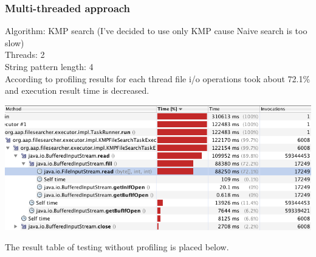 \documentclass[a4paper,12pt,final]{article}
\begin{document}
\subsubsection*{Multi-threaded approach}
Algorithm: KMP search (I've decided to use only KMP cause Naive search is too slow)\\
Threads: 2\\
String pattern length: 4\\

According to profiling results for each thread file i/o operations took about 72.1\% and execution result time is decreased.
\begin{center}
\includegraphics[width=16cm]{2Threads_KMP_11549_Profiling.png}
\end{center}

The result table of testing without profiling is placed below.

\end{document}
